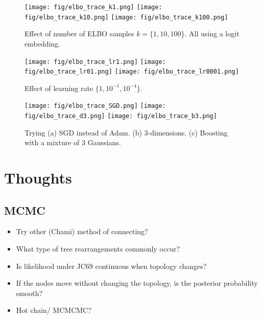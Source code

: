 \documentclass[11pt]{article}
\begin{document}
\begin{figure}[htbp]
\begin{center}
\texttt{[image: fig/elbo\_trace\_k1.png]}%
\texttt{[image: fig/elbo\_trace\_k10.png]}%
\texttt{[image: fig/elbo\_trace\_k100.png]}
\caption{Effect of number of ELBO samples $k=\{1, 10, 100\}$.
All using a logit embedding.}
\label{fig:k_samples}
\end{center}
\end{figure}

\begin{figure}[htbp]
\begin{center}
\texttt{[image: fig/elbo\_trace\_lr1.png]}%
\texttt{[image: fig/elbo\_trace\_lr01.png]}%
\texttt{[image: fig/elbo\_trace\_lr0001.png]}
\caption{Effect of learning rate $\{1, 10^{-1}, 10^{-4}\}$.}
\label{fig:lr}
\end{center}
\end{figure}

\begin{figure}[htbp]
\begin{center}
\texttt{[image: fig/elbo\_trace\_SGD.png]}%
\texttt{[image: fig/elbo\_trace\_d3.png]}%
\texttt{[image: fig/elbo\_trace\_b3.png]}
\caption{Trying (a) SGD instead of Adam. (b) 3-dimensions. (c) Boosting with a mixture of 3 Gaussians.}
\label{fig:lr}
\end{center}
\end{figure}


\section{Thoughts}
\subsection{MCMC}
\begin{itemize}
\item Try other (Chami) method of connecting?
\item What type of tree rearrangements commonly occur?
\item Is likelihood under JC69 continuous when topology changes?
\item If the nodes move without changing the topology, is the posterior probability smooth?
\item Hot chain/ MCMCMC?
\end{itemize}
\end{document}
